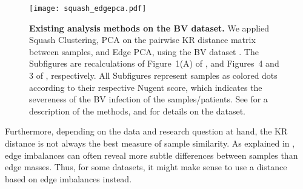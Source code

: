 \begin{figure}[!htb]
    \centering
    \texttt{[image: squash\_edgepca.pdf]}
    \begin{subfigure}{0pt}
        \label{fig:squash_edgepca:sub:squash}
    \end{subfigure}
    \begin{subfigure}{0pt}
        \label{fig:squash_edgepca:sub:pca}
    \end{subfigure}
    \begin{subfigure}{0pt}
        \label{fig:squash_edgepca:sub:epca}
    \end{subfigure}
    \caption[Existing analysis methods on the BV dataset]{
        \textbf{Existing analysis methods on the BV dataset.}
        We applied  Squash Clustering,
         PCA on the pairwise KR distance matrix between samples,
        and  Edge PCA,
        using the \acf{BV} dataset \cite{Srinivasan2012}.
        The Subfigures are recalculations of Figure~1(A) of \cite{Srinivasan2012},
        and Figures~4 and 3 of \cite{Matsen2011b}, respectively.
        All Subfigures represent samples as colored dots according to their respective Nugent score,
        which indicates the severeness of the \ac{BV} infection of the samples/patients.
        See  for a description of the methods,
        and  for details on the dataset.
    }
    \label{fig:squash_edgepca}
\end{figure}

Furthermore, depending on the data and research question at hand,
the KR distance is not always the best measure of sample similarity.
As explained in ,
edge imbalances can often reveal more subtle differences between samples than edge masses.
Thus, for some datasets, it might make sense to use a distance based on edge imbalances instead.


